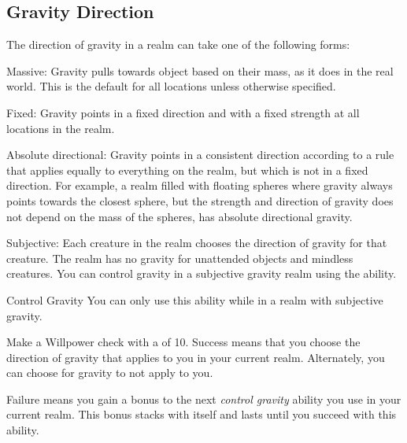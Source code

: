   \subsection{Gravity Direction}
    The direction of gravity in a realm can take one of the following forms:
    \begin{raggeditemize}
      \item Massive: Gravity pulls towards object based on their mass, as it does in the real world.
        This is the default for all locations unless otherwise specified.
      \item Fixed: Gravity points in a fixed direction and with a fixed strength at all locations in the realm.
      \item Absolute directional: Gravity points in a consistent direction according to a rule that applies equally to everything on the realm, but which is not in a fixed direction.
        For example, a realm filled with floating spheres where gravity always points towards the closest sphere, but the strength and direction of gravity does not depend on the mass of the spheres, has absolute directional gravity.
      \item Subjective: Each creature in the realm chooses the direction of gravity for that creature.
        The realm has no gravity for unattended objects and mindless creatures.
        You can control gravity in a subjective gravity realm using the  ability.
        \begin{activeability}{Control Gravity}{}
          \rankline
          You can only use this ability while in a realm with subjective gravity.

          Make a Willpower check with a  of 10.
          Success means that you choose the direction of gravity that applies to you in your current realm.
          Alternately, you can choose for gravity to not apply to you.

          Failure means you gain a  bonus to the next \textit{control gravity} ability you use in your current realm.
          This bonus stacks with itself and lasts until you succeed with this ability.
        \end{activeability}
    \end{raggeditemize}

